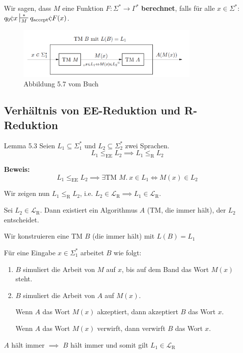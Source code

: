 \documentclass[a4paper, 11pt]{article}
\def\Lr{\mathcal{L}_\text{R}}
\begin{document}
                \begin{subbox}{}
                    Wir sagen, dass $M$ eine Funktion $F: \Sigma^* \to \Gamma^*$ \textbf{berechnet}, 
                    falls für alle $x \in \Sigma^*$: $q_0\cent x \sststile{M}{*} q_{\text{accept}}\cent F(x)$.
                \end{subbox}
                \begin{figure}[htp]
                    \includegraphics[width=0.8\textwidth]{Images/Basic_EE-Reduktion.png}
                    \caption{Abbildung 5.7 vom Buch}
                \end{figure}
            
            
            
                \subsection{Verhältnis von EE-Reduktion und R-Reduktion}
                \begin{mainbox}{Lemma 5.3}
                    Seien $L_1 \subseteq \Sigma_{1}^*$ und $L_2 \subseteq \Sigma_{2}^*$ zwei Sprachen.
                    $$L_1 \leq_{\text{EE}} L_2 \implies L_1 \leq_{\text{R}} L_2$$
                \end{mainbox}
                \textbf{Beweis: }
                $$L_1 \leq_{\text{EE}} L_2 \implies \exists \text{TM } M. \ x \in L_1 \iff M(x) \in L_2$$
            
                Wir zeigen nun $L_1 \leq_{\text{R}} L_2$, i.e. $L_2 \in \Lr \implies L_1 \in \Lr$.
            
                Sei $L_2 \in \Lr$. Dann existiert ein Algorithmus $A$ (TM, die immer hält), der $L_2$ entscheidet.

                Wir konstruieren eine TM $B$ (die immer hält) mit $L(B) = L_1$
            
                Für eine Eingabe $x \in \Sigma_1^*$ arbeitet $B$ wie folgt:
                \begin{enumerate}[label=(\roman*)]
                    \item $B$ simuliert die Arbeit von $M$ auf $x$, bis auf dem Band das Wort $M(x)$ steht.
                    \item $B$ simuliert die Arbeit von $A$ auf $M(x)$.
                    
                    Wenn $A$ das Wort $M(x)$ akzeptiert, dann akzeptiert $B$ das Wort $x$.
            
                    Wenn $A$ das Wort $M(x)$ verwirft, dann verwirft $B$ das Wort $x$.
                \end{enumerate}
                $A$ hält immer $\implies$ $B$ hält immer und somit gilt $L_1 \in \Lr$  
            
\end{document}
